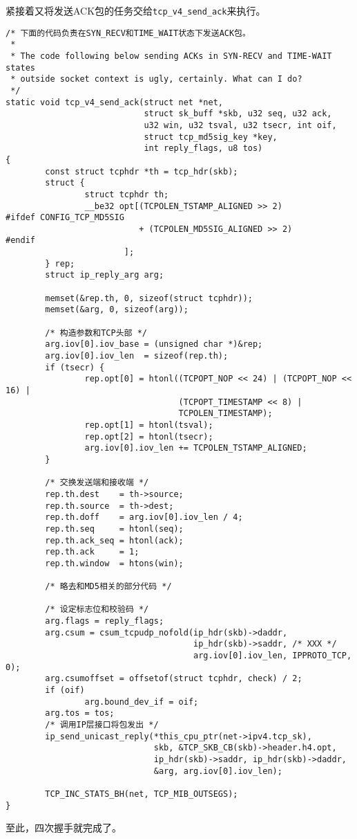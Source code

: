紧接着又将发送ACK包的任务交给\texttt{tcp_v4_send_ack}来执行。
\begin{verbatim}
/* 下面的代码负责在SYN_RECV和TIME_WAIT状态下发送ACK包。
 *
 * The code following below sending ACKs in SYN-RECV and TIME-WAIT states
 * outside socket context is ugly, certainly. What can I do? 
 */
static void tcp_v4_send_ack(struct net *net,
                            struct sk_buff *skb, u32 seq, u32 ack,
                            u32 win, u32 tsval, u32 tsecr, int oif,
                            struct tcp_md5sig_key *key,
                            int reply_flags, u8 tos)
{
        const struct tcphdr *th = tcp_hdr(skb);
        struct {
                struct tcphdr th;
                __be32 opt[(TCPOLEN_TSTAMP_ALIGNED >> 2)
#ifdef CONFIG_TCP_MD5SIG
                           + (TCPOLEN_MD5SIG_ALIGNED >> 2)
#endif
                        ];
        } rep;
        struct ip_reply_arg arg;

        memset(&rep.th, 0, sizeof(struct tcphdr));
        memset(&arg, 0, sizeof(arg));

        /* 构造参数和TCP头部 */
        arg.iov[0].iov_base = (unsigned char *)&rep;
        arg.iov[0].iov_len  = sizeof(rep.th);
        if (tsecr) {
                rep.opt[0] = htonl((TCPOPT_NOP << 24) | (TCPOPT_NOP << 16) |
                                   (TCPOPT_TIMESTAMP << 8) |
                                   TCPOLEN_TIMESTAMP);
                rep.opt[1] = htonl(tsval);
                rep.opt[2] = htonl(tsecr);
                arg.iov[0].iov_len += TCPOLEN_TSTAMP_ALIGNED;
        }

        /* 交换发送端和接收端 */
        rep.th.dest    = th->source;
        rep.th.source  = th->dest;
        rep.th.doff    = arg.iov[0].iov_len / 4;
        rep.th.seq     = htonl(seq);
        rep.th.ack_seq = htonl(ack);
        rep.th.ack     = 1;
        rep.th.window  = htons(win);

        /* 略去和MD5相关的部分代码 */

        /* 设定标志位和校验码 */
        arg.flags = reply_flags;
        arg.csum = csum_tcpudp_nofold(ip_hdr(skb)->daddr,
                                      ip_hdr(skb)->saddr, /* XXX */
                                      arg.iov[0].iov_len, IPPROTO_TCP, 0);
        arg.csumoffset = offsetof(struct tcphdr, check) / 2;
        if (oif)
                arg.bound_dev_if = oif;
        arg.tos = tos;
        /* 调用IP层接口将包发出 */
        ip_send_unicast_reply(*this_cpu_ptr(net->ipv4.tcp_sk),
                              skb, &TCP_SKB_CB(skb)->header.h4.opt,
                              ip_hdr(skb)->saddr, ip_hdr(skb)->daddr,
                              &arg, arg.iov[0].iov_len);

        TCP_INC_STATS_BH(net, TCP_MIB_OUTSEGS);
}
\end{verbatim}
至此，四次握手就完成了。

